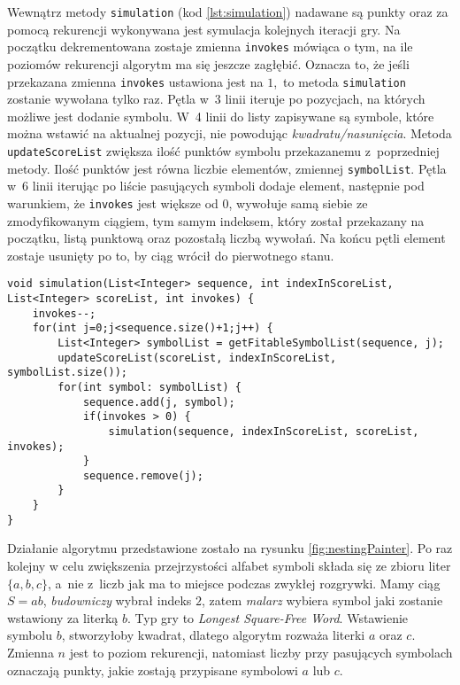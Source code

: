 \documentclass[document]{xmgr}
\begin{document}
Wewnątrz metody \texttt{simulation} (kod \ref{lst:simulation}) nadawane są punkty oraz za pomocą rekurencji wykonywana jest symulacja kolejnych iteracji gry. Na początku dekrementowana zostaje zmienna \texttt{invokes} mówiąca o tym, na ile poziomów rekurencji algorytm ma się jeszcze zagłębić. Oznacza to, że jeśli przekazana zmienna \texttt{invokes} ustawiona jest na $1$,~to metoda \texttt{simulation} zostanie wywołana tylko raz. Pętla w~3 linii iteruje po pozycjach, na których możliwe jest dodanie symbolu. W~4 linii do listy zapisywane są symbole, które można wstawić na aktualnej pozycji, nie powodując \emph{kwadratu/nasunięcia}. Metoda \texttt{updateScoreList} zwiększa ilość punktów symbolu przekazanemu z~poprzedniej metody. Ilość punktów jest równa liczbie elementów, zmiennej \texttt{symbolList}. Pętla w~6 linii iterując po liście pasujących symboli dodaje element, następnie pod warunkiem, że \mbox{\texttt{invokes}} jest większe od $0$, wywołuje samą siebie ze zmodyfikowanym ciągiem, tym samym indeksem, który został przekazany na początku, listą punktową oraz pozostałą liczbą wywołań. Na końcu pętli element zostaje usunięty po to, by ciąg wrócił do pierwotnego stanu.

\newpage
\begin{lstlisting}[caption={Metoda rekurencyjnie wykonująca symulacje kolejnych ruchów.},label=lst:simulation]
void simulation(List<Integer> sequence, int indexInScoreList, List<Integer> scoreList, int invokes) {
	invokes--;
	for(int j=0;j<sequence.size()+1;j++) {
		List<Integer> symbolList = getFitableSymbolList(sequence, j);
		updateScoreList(scoreList, indexInScoreList, symbolList.size());
		for(int symbol: symbolList) {
			sequence.add(j, symbol);
			if(invokes > 0) {
				simulation(sequence, indexInScoreList, scoreList, invokes);
			}
			sequence.remove(j);
		}
	}
}
\end{lstlisting}

Działanie algorytmu przedstawione zostało na rysunku \ref{fig:nestingPainter}. Po raz kolejny w celu zwiększenia przejrzystości alfabet symboli składa się ze zbioru liter $\{a, b, c\}$, a~nie z~liczb jak ma to miejsce podczas zwykłej rozgrywki. Mamy ciąg $S = ab$, \emph{budowniczy} wybrał indeks $2$, zatem \emph{malarz} wybiera symbol jaki zostanie wstawiony za literką $b$. Typ gry to \emph{Longest Square-Free Word}. Wstawienie symbolu $b$, stworzyłoby kwadrat, dlatego algorytm rozważa literki $a$ oraz $c$. Zmienna $n$ jest to poziom rekurencji, natomiast liczby przy pasujących symbolach oznaczają punkty, jakie zostają przypisane symbolowi $a$ lub $c$. 
\end{document}
